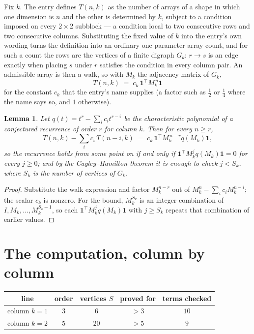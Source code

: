 \documentclass[11pt,a4paper]{article}
\theoremstyle{plain}
\newtheorem{lemma}[theorem]{Lemma}
\theoremstyle{definition}
\begin{document}
Fix $k$. The entry defines $T(n,k)$ as the number of arrays of a shape in which one dimension
is $n$ and the other is determined by $k$, subject to a condition imposed on every
$2\times2$ subblock --- a condition local to two consecutive rows and two consecutive columns.
Substituting the fixed value of $k$ into the entry's own wording turns the definition into an
ordinary one-parameter array count, and for such a count the rows are the vertices of a finite
digraph $G_k$: $r\to s$ is an edge exactly when placing $s$ under $r$ satisfies the condition
in every column pair. An admissible array is then a walk, so with $M_k$ the adjacency matrix
of $G_k$,
\[
T(n,k)\;=\;c_k\,\mathbf{1}^{\!\top}M_k^{\,n}\mathbf{1}
\]
for the constant $c_k$ that the entry's name supplies (a factor such as $\tfrac12$ or
$\tfrac14$ where the name says so, and $1$ otherwise).

\begin{lemma}\label{lem:crit}
Let $q(t)=t^{r}-\sum_i c_it^{r-i}$ be the characteristic polynomial of a conjectured
recurrence of order $r$ for column $k$. Then for every $n\ge r$,
\[
T(n,k)-\sum_i c_i\,T(n-i,k)\;=\;c_k\,\mathbf{1}^{\!\top}M_k^{\,n-r}q(M_k)\mathbf{1},
\]
so the recurrence holds from some point on if and only if
$\mathbf{1}^{\!\top}M_k^{j}q(M_k)\mathbf{1}=0$ for every $j\ge0$; and by the
Cayley--Hamilton theorem it is enough to check $j<S_k$, where $S_k$ is the number of vertices
of $G_k$.
\end{lemma}

\begin{proof}
Substitute the walk expression and factor $M_k^{n-r}$ out of $M_k^{n}-\sum_ic_iM_k^{n-i}$;
the scalar $c_k$ is nonzero. For the bound, $M_k^{S_k}$ is an integer combination of
$I,M_k,\dots,M_k^{S_k-1}$, so each $\mathbf{1}^{\!\top}M_k^{j}q(M_k)\mathbf{1}$ with
$j\ge S_k$ repeats that combination of earlier values.
\end{proof}

\section{The computation, column by column}

\begin{center}
\begin{tabular}{ccccc}
line & order & vertices $S$ & proved for & terms checked \\ \hline
column $k$$=1$ & $3$ & $6$ & $>3$ & $10$ \\
column $k$$=2$ & $5$ & $20$ & $>5$ & $9$ \\
\end{tabular}
\end{center}
\end{document}
